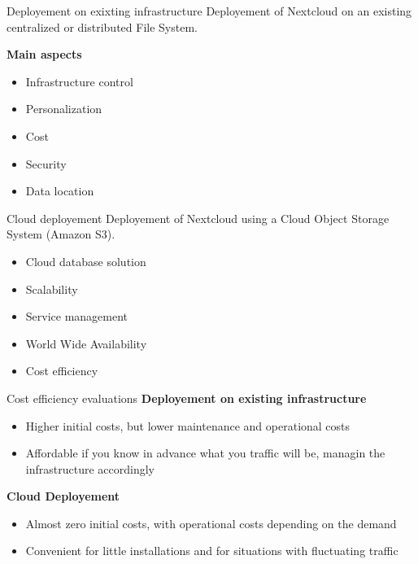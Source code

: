 \documentclass[11pt]{beamer}
\begin{document}
\begin{frame}{Deployement on exixting infrastructure}
	Deployement of Nextcloud on an existing centralized or distributed File System.
	
	\textbf{Main aspects}
	\begin{itemize}
		\item Infrastructure control
		\item Personalization
		\item Cost
		\item Security
		\item Data location
	\end{itemize}
\end{frame}

\begin{frame}{Cloud deployement}
	Deployement of Nextcloud using a Cloud Object Storage System (Amazon S3).
	\begin{itemize}
		\item Cloud database solution
		\item Scalability
		\item Service management
		\item World Wide Availability
		\item Cost efficiency
	\end{itemize}
\end{frame}

\begin{frame}{Cost efficiency evaluations}
	\textbf{Deployement on existing infrastructure}
	\begin{itemize}
		\item Higher initial costs, but lower maintenance and operational costs
		\item Affordable if you know in advance what you traffic will be, managin the infrastructure accordingly
	\end{itemize}
	
	\textbf{Cloud Deployement}
	\begin{itemize}
		\item Almost zero initial costs, with operational costs depending on the demand
		\item Convenient for little installations and for situations with fluctuating traffic
	\end{itemize}
\end{frame}
\end{document}
